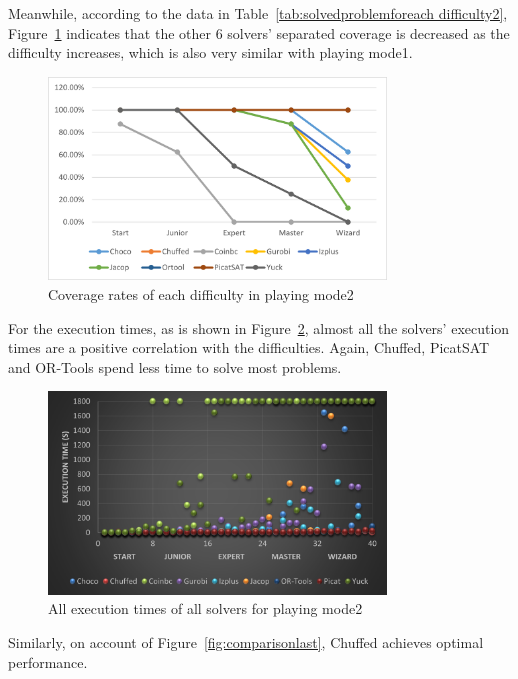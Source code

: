 Meanwhile, according to the data in Table~\ref{tab:solvedproblemforeach difficulty2}, Figure~\ref{fig:mode2eva4} indicates that the other 6 solvers' separated coverage is decreased as the difficulty increases, which is also very similar with playing mode1.
 \begin{figure}[H]
   \centering
    \includegraphics[width=0.8\textwidth]{figs/mode2seperatedcoverage.png}
    \caption{Coverage rates of each difficulty in playing mode2}
    \label{fig:mode2eva4}
\end{figure}
For the execution times, as is shown in Figure~\ref{fig:mode2time2}, almost all the solvers' execution times are a positive correlation with the difficulties. Again, Chuffed, PicatSAT and OR-Tools spend less time to solve most problems. 
\begin{figure}[H]
    \centering
    \includegraphics[width=0.8\textwidth]{figs/time2all.png}
    \caption{All execution times of all solvers for playing mode2}
    \label{fig:mode2time2}
\end{figure}
Similarly, on account of Figure~\ref{fig:comparisonlast}, Chuffed achieves optimal performance. 
